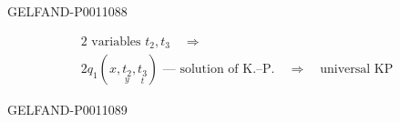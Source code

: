 \begin{GelfandAdjacentEvidence}{GELFAND-P001108}{8}


\[
\begin{gathered}
2\text{ variables }t_2,t_3\quad\Rightarrow\\
2q_1(x,\underset{y}{t_2},\underset{t}{t_3})
\text{ — solution of K.–P.}\quad\Rightarrow\quad\text{universal KP}
\end{gathered}
\]
\end{GelfandAdjacentEvidence}
\begin{GelfandAdjacentEvidence}{GELFAND-P001108}{9}

\end{GelfandAdjacentEvidence}



